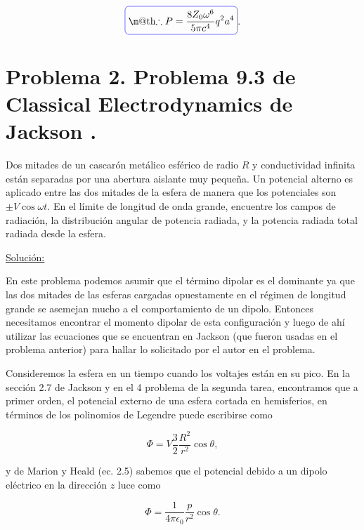 \documentclass[a4paper,11pt]{article}
\makeatletter
\numberwithin{equation}{section}
\newcommand*{\boxcolor}{blue}
\renewcommand{\boxed}[1]{\textcolor{\boxcolor}{%
\tikz[baseline={([yshift=-1ex]current bounding box.center)}] \node [rectangle, minimum width=1ex,rounded corners,draw] {\normalcolor\m@th$\displaystyle#1$};}}
\makeatother
\begin{document}
\begin{equation}
 \boxed{\therefore P = \frac{8Z_0\omega^6}{5\pi c^4}q^2a^4}.
\end{equation}

\newpage

\section{Problema 2. Problema 9.3 de Classical Electrodynamics de 
Jackson \cite{jackson}.}

Dos mitades de un cascarón metálico esférico de radio $R$ y conductividad infinita 
están separadas por una abertura aislante muy pequeña. Un potencial alterno es 
aplicado entre las dos mitades de la esfera de manera que los potenciales son 
$\pm V \cos{\omega t}$. En el límite de longitud de onda grande, encuentre los campos 
de radiación, la distribución angular de potencia radiada, y la potencia radiada 
total radiada desde la esfera. 

\vspace{.3cm}

\underline{Solución:} \vspace{.3cm}

En este problema podemos asumir que el término dipolar es el dominante ya que 
las dos mitades de las esferas cargadas opuestamente en el régimen de longitud 
grande se asemejan mucho a el comportamiento de un dipolo. Entonces necesitamos 
encontrar el momento dipolar de esta configuración y luego de ahí utilizar las 
ecuaciones que se encuentran en Jackson \cite{jackson} (que fueron usadas en el 
problema anterior) para hallar lo solicitado por el autor en el problema. 

\vspace{.3cm}

Consideremos la esfera en un tiempo cuando los voltajes están en su pico. En la 
sección 2.7 de Jackson \cite{jackson} y en el 4 problema de la segunda tarea, 
encontramos que a primer orden, el potencial externo de una esfera cortada 
en hemisferios, en términos de los polinomios de Legendre puede escribirse como 

\begin{equation}
 \Phi = V \frac{3}{2}\frac{R^2}{r^2}\cos{\theta},
\end{equation}

y de Marion y Heald (ec. 2.5) \cite{marion} sabemos que el potencial debido a 
un dipolo eléctrico en la dirección $z$ luce como 

\begin{equation}
 \Phi = \frac{1}{4\pi\epsilon_0}\frac{p}{r^2}\cos{\theta}.
\end{equation}
\end{document}
